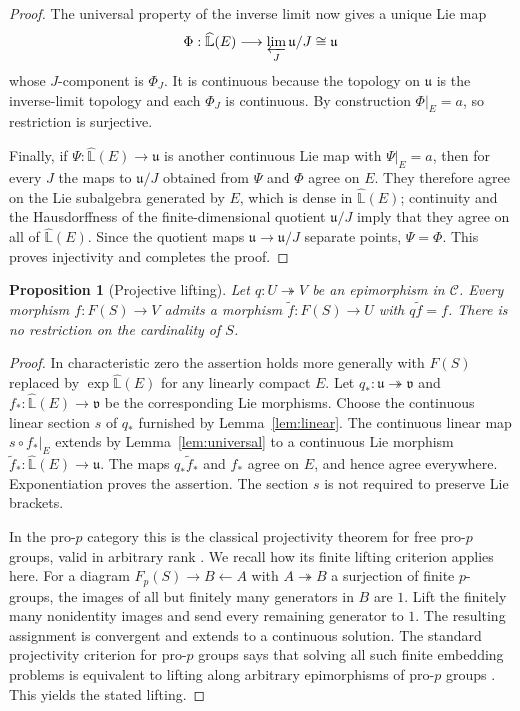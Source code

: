 \documentclass[10pt,a4paper]{amsart}
\newtheorem{proposition}[theorem]{Proposition}
\newcommand{\C}{\mathcal C}
\newcommand{\LL}{\widehat{\mathbb L}}
\begin{document}
\begin{proof}
The universal property of the inverse limit now gives a unique Lie map
\[
 \Phi:\LL(E)\longrightarrow\varprojlim_J\mathfrak u/J
       \cong\mathfrak u
\]
whose $J$-component is $\Phi_J$.  It is continuous because the topology on
$\mathfrak u$ is the inverse-limit topology and each $\Phi_J$ is
continuous.  By construction $\Phi|_E=a$, so restriction is surjective.

Finally, if $\Psi:\LL(E)\to\mathfrak u$ is another continuous Lie map
with $\Psi|_E=a$, then for every $J$ the maps to $\mathfrak u/J$ obtained
from $\Psi$ and $\Phi$ agree on $E$.  They therefore agree on the Lie
subalgebra generated by $E$, which is dense in $\LL(E)$; continuity and
the Hausdorffness of the finite-dimensional quotient $\mathfrak u/J$ imply
that they agree on all of $\LL(E)$.  Since the quotient maps
$\mathfrak u\to\mathfrak u/J$ separate points, $\Psi=\Phi$.
This proves injectivity and completes the proof.
\end{proof}

\begin{proposition}[Projective lifting]\label{prop:projective}
Let $q:U\twoheadrightarrow V$ be an epimorphism in $\C$.
Every morphism $f:F(S)\to V$ admits a morphism
$\widetilde f:F(S)\to U$ with $q\widetilde f=f$.
There is no restriction on the cardinality of $S$.
\end{proposition}
\begin{proof}
In characteristic zero the assertion holds more generally with
$F(S)$ replaced by $\exp\LL(E)$ for any linearly compact $E$.
Let $q_*:\mathfrak u\twoheadrightarrow\mathfrak v$ and
$f_*:\LL(E)\to\mathfrak v$ be the corresponding Lie morphisms.
Choose the continuous linear section $s$ of $q_*$ furnished by
Lemma~\ref{lem:linear}. The continuous linear map
$s\circ f_*|_E$ extends by Lemma~\ref{lem:universal} to a continuous
Lie morphism $\widetilde f_*:\LL(E)\to\mathfrak u$.
The maps $q_*\widetilde f_*$ and $f_*$ agree on $E$, and hence agree
everywhere. Exponentiation proves the assertion. The section $s$ is
not required to preserve Lie brackets.

In the pro-$p$ category this is the classical projectivity theorem for
free pro-$p$ groups, valid in arbitrary rank
\cite[Section~7.7]{RibesZalesskii}. We recall how its finite lifting
criterion applies here. For a diagram $F_p(S)\to B\leftarrow A$ with
$A\twoheadrightarrow B$ a surjection of finite $p$-groups, the images
of all but finitely many generators in $B$ are $1$. Lift the finitely
many nonidentity images and send every remaining generator to $1$.
The resulting assignment is convergent and extends to a continuous
solution. The standard projectivity criterion for pro-$p$ groups says
that solving all such finite embedding problems is equivalent to lifting
along arbitrary epimorphisms of pro-$p$ groups
\cite[Section~7.6]{RibesZalesskii}. This yields the stated lifting.
\end{proof}
\end{document}
